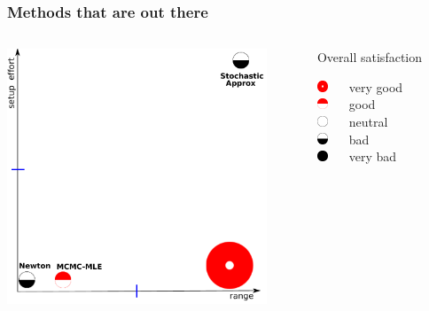 \documentclass[ 10pt]{beamer}
\begin{document}
\frame
{
\frametitle{Methods that are out there}
\begin{columns}[]
\begin{column}[T]{0.7\textwidth}
\includegraphics[height=3in]{mck-final-overlay.pdf}
\end{column}
\begin{column}[t]{0.3\textwidth}
Overall satisfaction
\vspace{1mm}

\includegraphics[height=0.13in]{CR5.pdf} $\quad$ very good\\
\vspace{1mm}
\includegraphics[height=0.13in]{CR4.pdf} $\quad$ good\\
\vspace{1mm}
\includegraphics[height=0.13in]{CR3.pdf} $\quad$ neutral\\
\vspace{1mm}
\includegraphics[height=0.13in]{CR2.pdf} $\quad$ bad\\
\vspace{1mm}
\includegraphics[height=0.13in]{CR1.pdf} $\quad$ very bad\\

\end{column}
\end{columns}
}
\end{document}
